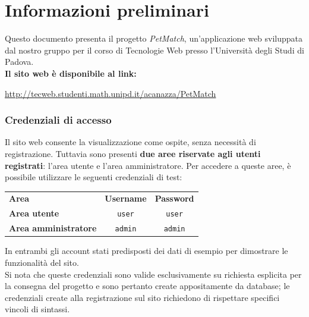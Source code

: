 \section*{Informazioni preliminari}
Questo documento presenta il progetto \textit{PetMatch}, un'applicazione web sviluppata dal nostro gruppo per il corso di Tecnologie Web presso l'Università degli Studi di Padova.\\
\textbf{Il sito web è disponibile al link:}
\begin{center}
\url{http://tecweb.studenti.math.unipd.it/acanazza/PetMatch}
\end{center}

\subsubsection*{Credenziali di accesso}
Il sito web consente la visualizzazione come ospite, senza necessità di registrazione. Tuttavia sono presenti \textbf{due aree riservate agli utenti registrati}: l'area utente e l'area amministratore. Per accedere a queste aree, è possibile utilizzare le seguenti credenziali di test:
\begin{center}
\begin{tabular}{|l|c|c|}
\hline
\rowcolor{brown}

\color{white}\textbf{Area} &
\color{white}\textbf{Username} &
\color{white}\textbf{Password} \\
\rowcolor{beige} 
\hline
\textbf{Area utente} & \texttt{user} & \texttt{user} \\
\rowcolor{beige} 
\hline
\textbf{Area amministratore} & \texttt{admin} & \texttt{admin} \\
\hline
\end{tabular}
\end{center}
In entrambi gli account stati predisposti dei dati di esempio per dimostrare le funzionalità del sito.\\
Si nota che queste credenziali sono valide esclusivamente su richiesta esplicita per la consegna del progetto e sono pertanto create appositamente da database; le credenziali create alla registrazione sul sito richiedono di rispettare specifici vincoli di sintassi.

